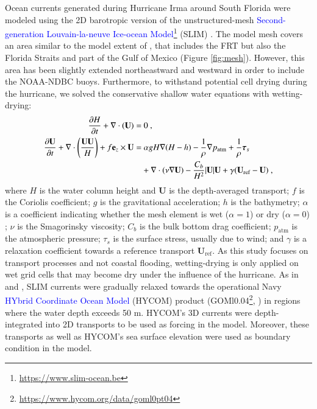 \documentclass[preprint,12pt,authoryear]{elsarticle}
\newcommand{\UV}{\mathbf{U}}
\newcommand{\modif}[1]{\textcolor{blue}{#1}}
\begin{document}
Ocean currents generated during Hurricane Irma around South Florida were modeled using the 2D barotropic version of the unstructured-mesh \modif{Second-generation Louvain-la-neuve Ice-ocean Model}\footnote{\url{https://www.slim-ocean.be}} (SLIM) \citep{lambrechts2008multi}. The model mesh covers an area similar to the model extent of \cite{dobbelaere2020coupled}, that includes the FRT but also the Florida Straits and part of the Gulf of Mexico (Figure \ref{fig:mesh}). However, this area has been slightly extended northeastward and westward in order to include the NOAA-NDBC buoys. Furthermore, to withstand potential cell drying during the hurricane, we solved the conservative shallow water equations with wetting-drying:
\begin{equation}
    \begin{split}
        \dfrac{\partial H}{\partial t} +\nabla\cdot(\UV) =& ~0~, \\
        \dfrac{\partial \UV}{\partial t}  + \nabla\cdot\left(\dfrac{\UV\UV}{H}\right) + f\mathbf{e}_z \times \UV =& ~\alpha gH\nabla(H-h) - \dfrac{1}{\rho}\nabla p_\text{atm} + \dfrac{1}{\rho}\text{\boldmath$\tau$}_s \\
         &+\nabla\cdot(\nu\nabla\UV) - \dfrac{C_b}{H^2}|\UV|\UV + \gamma(\UV_\text{ref}-\UV)~,
    \end{split} \label{eq:slim}
\end{equation}
where $H$ is the water column height and $\UV$ is the depth-averaged transport; $f$ is the Coriolis coefficient; $g$ is the gravitational acceleration; $h$ is the bathymetry; $\alpha$ is a coefficient indicating whether the mesh element is wet ($\alpha=1$) or dry ($\alpha=0$) \citep{le2020implicit}; $\nu$  is the Smagorinsky viscosity; $C_b$ is the bulk bottom drag coefficient; $p_\text{atm}$ is the atmospheric pressure; {\boldmath$\tau$}$_s$ is the surface stress, usually due to wind; and $\gamma$ is a relaxation coefficient towards a reference transport $\UV_\text{ref}$. As this study focuses on transport processes and not coastal flooding, wetting-drying is only applied on wet grid cells that may become dry under the influence of the hurricane. As in \cite{frys2020fine} and \cite{dobbelaere2020coupled}, SLIM currents were gradually relaxed towards the operational Navy \modif{HYbrid Coordinate Ocean Model} (HYCOM) product (GOMl0.04\footnote{\url{https://www.hycom.org/data/goml0pt04}}, \cite{chassignet2007hycom}) in regions where the water depth exceeds 50 m. HYCOM's 3D currents were depth-integrated into 2D transports to be used as forcing in the model. Moreover, these transports as well as HYCOM's sea surface elevation were used as boundary condition in the model.
\end{document}
